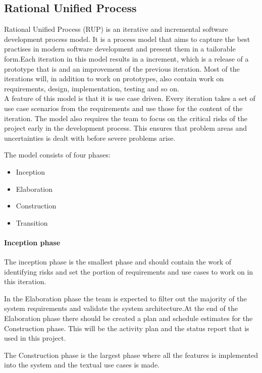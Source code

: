 \subsection{Rational Unified Process}
Rational Unified Process (RUP) is an iterative and incremental software development process model. It is a process model that aims to capture the best practises in modern software development and present them in a tailorable form.\cite{kruchten}Each iteration in this model results in a increment, which is a release of a prototype that is and an improvement of the previous iteration. Most of the iterations will, in addition to work on prototypes, also contain work on requirements, design, implementation, testing and so on.\\
\newline
A feature of this model is that it is use case driven. Every iteration takes a set of use case scenarios from the requirements and use those for the content of the iteration. The model also requires the team to focus on the critical risks of the project early in the development process. This ensures that problem areas and uncertainties is dealt with before severe problems arise. 

The model consists of four phases:

\begin{itemize}
\item{Inception}
\item{Elaboration}
\item{Construction}
\item{Transition}
\end{itemize}



\paragraph{Inception phase} The inception phase is the smallest phase and should contain the work of identifying risks and set the portion of requirements and use cases to work on in this iteration.

In the Elaboration phase the team is expected to filter out the majority of the system requirements and validate the system architecture.At the end of the Elaboration phase there should be created a plan and schedule estimates for the Construction phase. This will be the activity plan and the status report that is used in this project.

The Construction phase is the largest phase where all the features is implemented into the system and the textual use cases is made.

